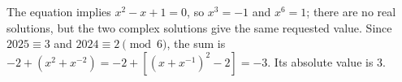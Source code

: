 The equation implies $x^2-x+1=0$, so $x^3=-1$ and $x^6=1$; there are no real solutions, but the two complex solutions give the same requested value. Since $2025\equiv3$ and $2024\equiv2\pmod6$, the sum is $-2+(x^2+x^{-2})=-2+[(x+x^{-1})^2-2]=-3$. Its absolute value is $\boxed3$.
